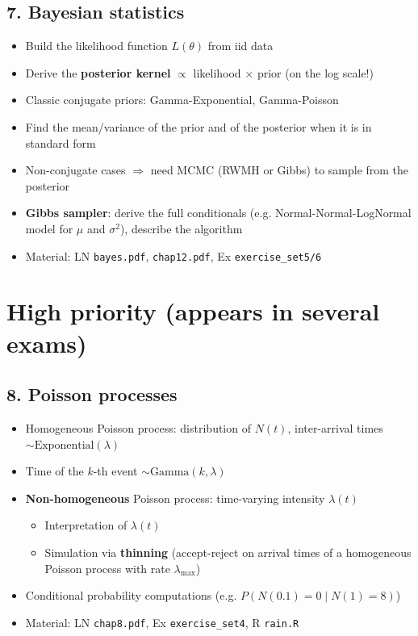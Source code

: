 \documentclass[11pt]{article}
\begin{document}
\subsection*{7. Bayesian statistics}
\begin{itemize}[leftmargin=*]
  \item Build the likelihood function $L(\theta)$ from iid data
  \item Derive the \textbf{posterior kernel} $\propto$ likelihood $\times$ prior (on the log scale!)
  \item Classic conjugate priors: Gamma-Exponential, Gamma-Poisson
  \item Find the mean/variance of the prior and of the posterior when it is in standard form
  \item Non-conjugate cases $\Rightarrow$ need MCMC (RWMH or Gibbs) to sample from the posterior
  \item \textbf{Gibbs sampler}: derive the full conditionals (e.g. Normal-Normal-LogNormal
  model for $\mu$ and $\sigma^2$), describe the algorithm
  \item Material: LN \texttt{bayes.pdf}, \texttt{chap12.pdf}, Ex \texttt{exercise\_set5/6}
\end{itemize}

\section*{\textcolor{primed}{High priority (appears in several exams)}}

\subsection*{8. Poisson processes}
\begin{itemize}[leftmargin=*]
  \item Homogeneous Poisson process: distribution of $N(t)$, inter-arrival times
  $\sim \mathrm{Exponential}(\lambda)$
  \item Time of the $k$-th event $\sim \mathrm{Gamma}(k,\lambda)$
  \item \textbf{Non-homogeneous} Poisson process: time-varying intensity $\lambda(t)$
  \begin{itemize}
    \item Interpretation of $\lambda(t)$
    \item Simulation via \textbf{thinning} (accept-reject on arrival times of a homogeneous
    Poisson process with rate $\lambda_{\max}$)
  \end{itemize}
  \item Conditional probability computations (e.g. $P(N(0.1)=0 \mid N(1)=8)$)
  \item Material: LN \texttt{chap8.pdf}, Ex \texttt{exercise\_set4}, R \texttt{rain.R}
\end{itemize}
\end{document}
